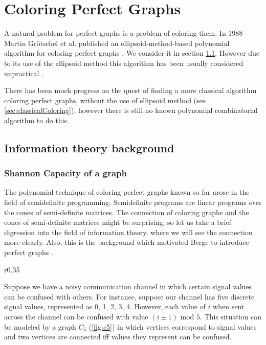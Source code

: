 \section{Coloring Perfect Graphs}

A natural problem for perfect graphs is a problem of coloring them. In 1988 Martin Grötschel et al. published an ellipsoid-method-based polynomial algorithm for coloring perfect graphs \cite{Grtschel1993}. We consider it in section \cref{sec:ellipsoidMethod}. However due to its use of the ellipsoid method this algorithm has been usually considered unpractical \cite{coloringSquareFree,Chudnovsky2003, coloringArtemis}.

There has been much progress on the quest of finding a more classical algorithm coloring perfect graphs, without the use of ellipsoid method (see \cref{sec:classicalColoring}), however there is still no known polynomial combinatorial algorithm to do this. 

\subsection{Information theory background}
\label{sec:ellipsoidMethod}

\subsubsection{Shannon Capacity of a graph}
 
The polynomial technique of coloring perfect graphs known so far arose in the field of semidefinite programming. Semidefinite programs are linear programs over the cones of semi-definite matrices. The connection of coloring graphs and the cones of semi-definite matrices might be surprising, so let us take a brief digression into the field of information theory, where we will see the connection more clearly. Also, this is the background which motivated Berge to introduce perfect graphs \cite{Chudnovsky2003}.

\begin{wrapfigure}{r}{0.35\textwidth}
  \label{fig:c5}
	
	\caption{Example noisy channel}%
\end{wrapfigure}

Suppose we have a noisy communication channel in which certain signal values can be confused with others. For instance, suppose our channel has five discrete signal values, represented as 0, 1, 2, 3, 4. However, each value of $i$ when sent across the channel can be confused with value $(i \pm 1)$ mod $5$. This situation can be modeled by a graph $C_5$ (\cref{fig:c5}) in which vertices correspond to signal values and two vertices are connected iff values they represent can be confused.

